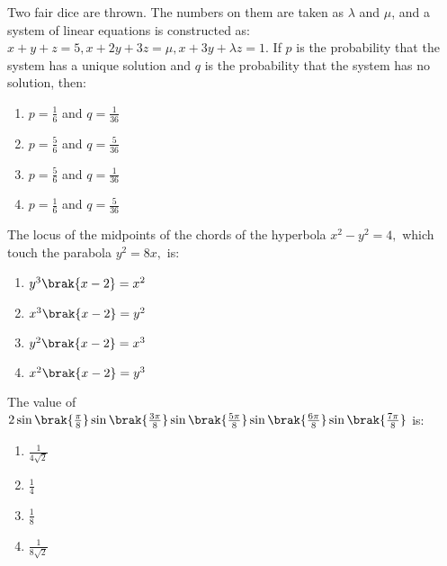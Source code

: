 \item Two fair dice are thrown. The numbers on them are taken as $\lambda$ and $\mu$, and a system of linear equations is constructed as:
$
x + y + z = 5,
x + 2y + 3z = \mu,
x + 3y + \lambda z = 1.
$
If $p$ is the probability that the system has a unique solution and $q$ is the probability that the system has no solution, then: \hfill {}
\begin{multicols}{4}
\begin{enumerate}
    \item $p = \frac{1}{6}$ and $q = \frac{1}{36}$
    \item $p = \frac{5}{6}$ and $q = \frac{5}{36}$
    \item $p = \frac{5}{6}$ and $q = \frac{1}{36}$
    \item $p = \frac{1}{6}$ and $q = \frac{5}{36}$
\end{enumerate}
\end{multicols}


\item The locus of the midpoints of the chords of the hyperbola $x^2 - y^2 = 4,$ which touch the parabola $y^2 = 8x,$ is: \hfill {}
\begin{multicols}{4}    
\begin{enumerate}
    \item $y^3\brak{x - 2} = x^2$
    \item $x^3\brak{x - 2} = y^2 $
    \item $y^2\brak{x - 2} = x^3$
    \item $x^2\brak{x - 2} = y^3 $
\end{enumerate}
\end{multicols}


\item The value of $2\sin \brak{ \frac{\pi}{8} } \sin \brak{ \frac{3\pi}{8} } \sin \brak{ \frac{5\pi}{8}} \sin \brak{ \frac{6\pi}{8} } \sin \brak{ \frac{7\pi}{8}}$
is:  \hfill {}
\begin{multicols}{4}
\begin{enumerate}
    \item $\frac{1}{4\sqrt{2}}$
    \item $\frac{1}{4}$
    \item $\frac{1}{8}$
    \item $\frac{1}{8\sqrt{2}}$
\end{enumerate}
\end{multicols}


